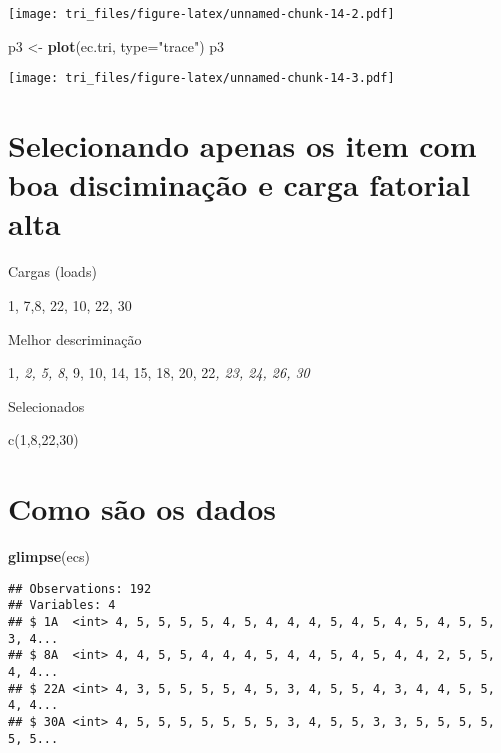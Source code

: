 \documentclass[]{article}
\newenvironment{Shaded}{\begin{snugshade}}{\end{snugshade}}
\newcommand{\KeywordTok}[1]{\textcolor[rgb]{0.13,0.29,0.53}{\textbf{#1}}}
\newcommand{\DataTypeTok}[1]{\textcolor[rgb]{0.13,0.29,0.53}{#1}}
\newcommand{\StringTok}[1]{\textcolor[rgb]{0.31,0.60,0.02}{#1}}
\newcommand{\OperatorTok}[1]{\textcolor[rgb]{0.81,0.36,0.00}{\textbf{#1}}}
\newcommand{\NormalTok}[1]{#1}
\begin{document}
\texttt{[image: tri\_files/figure-latex/unnamed-chunk-14-2.pdf]}

\begin{Shaded}
\begin{Highlighting}[]
\NormalTok{p3 <-}\StringTok{ }\KeywordTok{plot}\NormalTok{(ec.tri, }\DataTypeTok{type=}\StringTok{"trace"}\NormalTok{)}
\NormalTok{p3}
\end{Highlighting}
\end{Shaded}

\texttt{[image: tri\_files/figure-latex/unnamed-chunk-14-3.pdf]}

\section{Selecionando apenas os item com boa disciminação e carga
fatorial
alta}\label{selecionando-apenas-os-item-com-boa-disciminacao-e-carga-fatorial-alta}

Cargas (loads)

1, 7,8, 22, 10, 22, 30

Melhor descriminação

1\emph{, 2, 5, 8}, 9, 10, 14, 15, 18, 20, 22\emph{, 23, 24, 26, 30}

Selecionados

c(1,8,22,30)

\begin{Shaded}
\end{Shaded}

\section{Como são os dados}\label{como-sao-os-dados-1}

\begin{Shaded}
\begin{Highlighting}[]
\KeywordTok{glimpse}\NormalTok{(ecs)}
\end{Highlighting}
\end{Shaded}

\begin{verbatim}
## Observations: 192
## Variables: 4
## $ 1A  <int> 4, 5, 5, 5, 5, 4, 5, 4, 4, 4, 5, 4, 5, 4, 5, 4, 5, 5, 3, 4...
## $ 8A  <int> 4, 4, 5, 5, 4, 4, 4, 5, 4, 4, 5, 4, 5, 4, 4, 2, 5, 5, 4, 4...
## $ 22A <int> 4, 3, 5, 5, 5, 5, 4, 5, 3, 4, 5, 5, 4, 3, 4, 4, 5, 5, 4, 4...
## $ 30A <int> 4, 5, 5, 5, 5, 5, 5, 5, 3, 4, 5, 5, 3, 3, 5, 5, 5, 5, 5, 5...
\end{verbatim}
\end{document}
